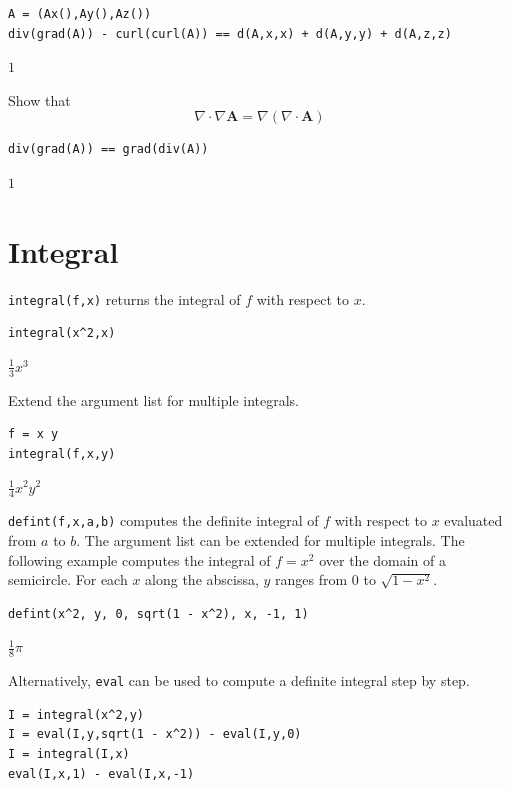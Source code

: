 \documentclass[12pt]{article}
\begin{document}
{\color{blue}
\begin{verbatim}
A = (Ax(),Ay(),Az())
div(grad(A)) - curl(curl(A)) == d(A,x,x) + d(A,y,y) + d(A,z,z)
\end{verbatim}}

$1$

\bigskip
Show that
\begin{equation*}
\nabla\cdot\nabla\mathbf A=\nabla(\nabla\cdot\mathbf A)
\end{equation*}

{\color{blue}
\begin{verbatim}
div(grad(A)) == grad(div(A))
\end{verbatim}}

$1$

\newpage

\section{Integral}

\verb$integral(f,x)$ returns the integral of $f$ with respect to $x$.

{\color{blue}
\begin{verbatim}
integral(x^2,x)
\end{verbatim}
}

$\displaystyle \tfrac{1}{3}x^3$

\bigskip
Extend the argument list for multiple integrals.

{\color{blue}
\begin{verbatim}
f = x y
integral(f,x,y)
\end{verbatim}
}

$\displaystyle \tfrac{1}{4}x^2y^2$

\bigskip
\verb$defint(f,x,a,b)$
computes the definite integral of $f$ with respect to $x$ evaluated from
$a$ to $b$.
The argument list can be extended for multiple integrals.
The following example computes the integral of $f=x^2$
over the domain of a semicircle.
For each $x$ along the abscissa, $y$ ranges from 0 to $\sqrt{1-x^2}$.

{\color{blue}
\begin{verbatim}
defint(x^2, y, 0, sqrt(1 - x^2), x, -1, 1)
\end{verbatim}
}

$\displaystyle \tfrac{1}{8}\pi$

\bigskip
Alternatively, \verb$eval$ can be used to compute a definite integral step by step.

{\color{blue}
\begin{verbatim}
I = integral(x^2,y)
I = eval(I,y,sqrt(1 - x^2)) - eval(I,y,0)
I = integral(I,x)
eval(I,x,1) - eval(I,x,-1)
\end{verbatim}
}
\end{document}
